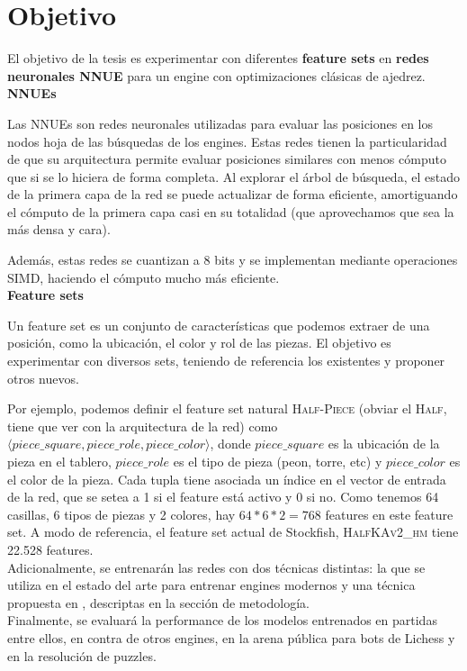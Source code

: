 \newpage
\section*{Objetivo}

El objetivo de la tesis es experimentar con diferentes \textbf{feature sets} en \textbf{redes neuronales NNUE} para un engine con optimizaciones clásicas de ajedrez. \\

\textbf{NNUEs}

Las NNUEs son redes neuronales utilizadas para evaluar las posiciones en los nodos hoja de las búsquedas de los engines. Estas redes tienen la particularidad de que su arquitectura permite evaluar posiciones similares con menos cómputo que si se lo hiciera de forma completa. Al explorar el árbol de búsqueda, el estado de la primera capa de la red se puede actualizar de forma eficiente, amortiguando el cómputo de la primera capa casi en su totalidad (que aprovechamos que sea la más densa y cara).

Además, estas redes se cuantizan a 8 bits y se implementan mediante operaciones SIMD, haciendo el cómputo mucho más eficiente. \\

\textbf{Feature sets}

Un feature set es un conjunto de características que podemos extraer de una posición, como la ubicación, el color y rol de las piezas. El objetivo es experimentar con diversos sets, teniendo de referencia los existentes y proponer otros nuevos.

Por ejemplo, podemos definir el feature set natural \textsc{Half-Piece} (obviar el \textsc{Half}, tiene que ver con la arquitectura de la red) como $\langle piece\_square, piece\_role, piece\_color \rangle$, donde $piece\_square$ es la ubicación de la pieza en el tablero, $piece\_role$ es el tipo de pieza (peon, torre, etc) y $piece\_color$ es el color de la pieza. Cada tupla tiene asociada un índice en el vector de entrada de la red, que se setea a 1 si el feature está activo y 0 si no. Como tenemos 64 casillas, 6 tipos de piezas y 2 colores, hay $64*6*2=768$ features en este feature set.
A modo de referencia, el feature set actual de Stockfish, \textsc{HalfKAv2\_hm} tiene 22.528 features. \\

Adicionalmente, se entrenarán las redes con dos técnicas distintas: la que se utiliza en el estado del arte para entrenar engines modernos y una técnica propuesta en \cite{dlchess:2014}, descriptas en la sección de metodología. \\

Finalmente, se evaluará la performance de los modelos entrenados en partidas entre ellos, en contra de otros engines, en la arena pública para bots de Lichess y en la resolución de puzzles.

